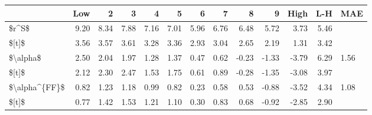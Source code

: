 \begin{tabular}{lrrrrrrrrrrrl}
\toprule
{} &   Low &     2 &     3 &     4 &     5 &     6 &     7 &     8 &     9 &  High &   L-H &   MAE \\
\midrule
\$r\textasciicircum S\$         &  9.20 &  8.34 &  7.88 &  7.16 &  7.01 &  5.96 &  6.76 &  6.48 &  5.72 &  3.73 &  5.46 &       \\
\$[t]\$         &  3.56 &  3.57 &  3.61 &  3.28 &  3.36 &  2.93 &  3.04 &  2.65 &  2.19 &  1.31 &  3.42 &       \\
\$\textbackslash alpha\$      &  2.50 &  2.04 &  1.97 &  1.28 &  1.37 &  0.47 &  0.62 & -0.23 & -1.33 & -3.79 &  6.29 &  1.56 \\
\$[t]\$         &  2.12 &  2.30 &  2.47 &  1.53 &  1.75 &  0.61 &  0.89 & -0.28 & -1.35 & -3.08 &  3.97 &       \\
\$\textbackslash alpha\textasciicircum \{FF\}\$ &  0.82 &  1.23 &  1.18 &  0.99 &  0.82 &  0.23 &  0.58 &  0.53 & -0.88 & -3.52 &  4.34 &  1.08 \\
\$[t]\$         &  0.77 &  1.42 &  1.53 &  1.21 &  1.10 &  0.30 &  0.83 &  0.68 & -0.92 & -2.85 &  2.90 &       \\
\bottomrule
\end{tabular}
